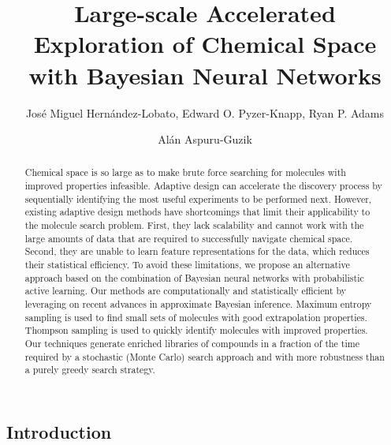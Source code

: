 \documentclass{pnastwo}
\begin{document}
\title{Large-scale Accelerated Exploration of Chemical Space with Bayesian Neural Networks}

\author{Jos\'e Miguel Hern\'andez-Lobato, Edward O. Pyzer-Knapp, 
Ryan P. Adams \and Al{\'a}n Aspuru-Guzik}


\maketitle

\begin{article}

\begin{abstract} 
Chemical space is so large as to make brute force searching for molecules with
improved properties infeasible. Adaptive design can accelerate the discovery
process by sequentially identifying the most useful experiments to be performed
next. However, existing adaptive design methods have shortcomings that limit
their applicability to the molecule search problem. First, they lack
scalability and cannot work with the large amounts of data that are required to
successfully navigate chemical space. Second, they are unable to learn feature
representations for the data, which reduces their statistical efficiency. To
avoid these limitations, we propose an alternative approach based on the
combination of Bayesian neural networks with probabilistic active learning. Our
methods are computationally and statistically efficient by leveraging on recent
advances in approximate Bayesian inference. Maximum entropy sampling is used
to find small sets of molecules with good extrapolation properties. Thompson
sampling is used to quickly identify molecules with improved properties. Our
techniques generate enriched libraries of compounds in a fraction
of the time required by a stochastic (Monte Carlo) search approach and with
more robustness than a purely greedy search strategy.
\end{abstract}





\section{Introduction}


\end{article}
\end{document}
